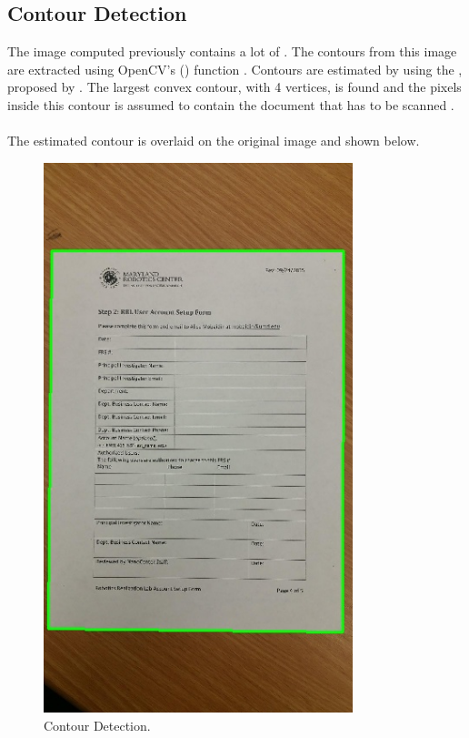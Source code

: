 \pagebreak

\subsection{Contour Detection}

The image computed previously contains a lot of . The contours from this image are extracted using OpenCV's (\cite{Reference1})  function . Contours are estimated by using the , proposed by \cite{Reference4}. The largest convex contour, with 4 vertices, is found and the pixels inside this contour is assumed to contain the document that has to be scanned .
\\
\\
The estimated contour is overlaid on the original image and shown below.\\ 

\begin{figure}[th]
	\centering
	\includegraphics[height=16cm ]{Figures/contour_detection}
	\caption[Contour Detection]{Contour Detection.}
	\label{fig:ContourDetection}
\end{figure}

